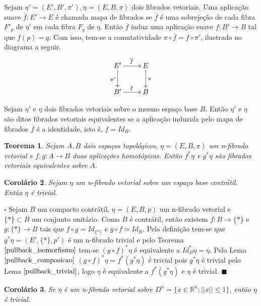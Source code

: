 \documentclass[12pt]{book}
\newtheorem{teorema}{Teorema}[section]
\newtheorem{corolario}[teorema]{Corolário}
\newenvironment{prova}[1]{$\square$ #1}{\hfill$\blacksquare$}
\newcommand{\norma}[1]{||#1||}
\newcommand{\real}[1]{\mathbb{R}^{#1}}
\begin{document}
	Sejam $ \eta'=(E',B',\pi'), \eta=(E,B,\pi)$ dois fibrados vetoriais.  Uma aplicação suave $\overline{f}:E'\to E$ é chamada mapa de fibrados se $\overline{f}$ é uma sobrejeção de cada fibra $F'_{p}$ de $\eta'$ em cada fibra $F_{q}$ de $\eta$. Então $\overline{f}$ induz uma aplicação suave $f:B'\to B$ tal que $f(p)=q$. Com isso, tem-se a comutatividade $\pi\circ \overline{f} = f\circ\pi'$, ilustrado no diagrama a seguir. 
	$$
	\xymatrix{
		E'\ar[d]_{\pi'}\ar[r]^{\overline{f}} & E\ar[d]^{\pi}
		\\
		B'\ar[r]^{f} & B
	}
	$$
	
	
	Sejam $\eta'$ e $\eta$ dois fibrados vetoriais sobre o mesmo espaço base $B$. Então $\eta'$ e $\eta$ são ditos fibrados vetoriais equivalentes se a aplicação induzida pelo mapa de fibrados $\overline{f}$ é a identidade, isto é, $f=Id_{B}$.
	
	\begin{teorema}\label{pullback_isomorfismo}
		Sejam $A, B$ dois espaços topológicos, $\eta=(E, B, \pi)$ um n-fibrado vetorial e $f,g: A\to B$ duas aplicações homotópicas. Então $f^{*}\eta $ e $g^{*}\eta$ são fibrados vetoriais equivalentes sobre $A$.
	\end{teorema}
	
	\begin{corolario}\label{pullback_contratil}
		Sejam $\eta$ um n-fibrado vetorial sobre um espaço base contrátil. Então $\eta$ é trivial.
	\end{corolario}
	\begin{prova}
		Sejam $B$ um compacto contrátil, $\eta=(E, B, p)$ um n-fibrado vetorial e $\{*\} \subset B$ um conjunto unitário. Como $B$ é contrátil, então existem $f:B\to \{*\}$ e $g:\{*\}\to B$ tais que $f\circ g = Id_{\{*\}}$ e $g\circ f \simeq Id_{B}$. Pela definição tem-se que $g^{*}\eta = (E', \{*\}, p')$ é um n-fibrado trivial e pelo Teorema $\ref{pullback_isomorfismo}$ tem-se $(g\circ f)^{*}\eta $ é equivalente a $ Id_{B}^{*}\eta = \eta$. Pelo Lema $\ref{pullback_composicao}$ $(g\circ f)^{*}\eta = f^{*}(g^{*}\eta) $ é trivial pois $g^{*}\eta$ é trivial pelo Lema $\ref{pullback_trivial}$, logo $ \eta $ é equivalente a $f^{*}(g^{*}\eta)$ e $\eta$ é trivial.
	\end{prova}
	
	\begin{corolario}\label{corolario_fibrado_sobre_Dn}
		Se $\eta$ é um n-fibrado vetorial sobre $D^{n} = \{ x\in \real{n}:\norma{x}\leq 1\}$, então $\eta$ é trivial.
	\end{corolario}
\end{document}
